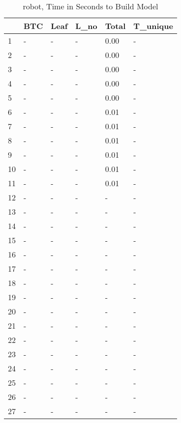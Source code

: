 \begin{table}
\centering
\caption{robot, Time in Seconds to Build Model}
\label{robot_model_time}
\begin{tabular}{llllll}
\toprule
{} & BTC & Leaf & L\_no & Total & T\_unique \\
\midrule
1  &   - &    - &    - &  0.00 &        - \\
2  &   - &    - &    - &  0.00 &        - \\
3  &   - &    - &    - &  0.00 &        - \\
4  &   - &    - &    - &  0.00 &        - \\
5  &   - &    - &    - &  0.00 &        - \\
6  &   - &    - &    - &  0.01 &        - \\
7  &   - &    - &    - &  0.01 &        - \\
8  &   - &    - &    - &  0.01 &        - \\
9  &   - &    - &    - &  0.01 &        - \\
10 &   - &    - &    - &  0.01 &        - \\
11 &   - &    - &    - &  0.01 &        - \\
12 &   - &    - &    - &     - &        - \\
13 &   - &    - &    - &     - &        - \\
14 &   - &    - &    - &     - &        - \\
15 &   - &    - &    - &     - &        - \\
16 &   - &    - &    - &     - &        - \\
17 &   - &    - &    - &     - &        - \\
18 &   - &    - &    - &     - &        - \\
19 &   - &    - &    - &     - &        - \\
20 &   - &    - &    - &     - &        - \\
21 &   - &    - &    - &     - &        - \\
22 &   - &    - &    - &     - &        - \\
23 &   - &    - &    - &     - &        - \\
24 &   - &    - &    - &     - &        - \\
25 &   - &    - &    - &     - &        - \\
26 &   - &    - &    - &     - &        - \\
27 &   - &    - &    - &     - &        - \\

\end{tabular}
\end{table}
